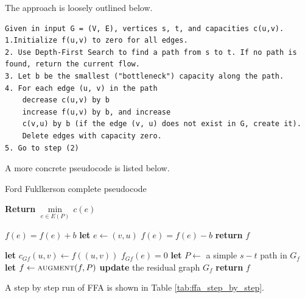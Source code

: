 \documentclass[a4paper]{article}
\begin{document}
The approach is loosely outlined below.
\begin{verbatim}
Given in input G = (V, E), vertices s, t, and capacities c(u,v).
1.Initialize f(u,v) to zero for all edges.
2. Use Depth-First Search to find a path from s to t. If no path is found, return the current flow.
3. Let b be the smallest ("bottleneck") capacity along the path.
4. For each edge (u, v) in the path
    decrease c(u,v) by b
    increase f(u,v) by b, and increase
    c(v,u) by b (if the edge (v, u) does not exist in G, create it).
    Delete edges with capacity zero.
5. Go to step (2)
\end{verbatim}

A more concrete pseudocode is listed below.
\begin{algorithm}[H] %
\caption{Ford Fuklkerson complete pseudocode}
\label{alg:ff_pseudo_final}
\begin{algorithmic}[1]
\State \textbf{Return} $\underset{e\in E\left( P \right)}{\mathop{\min }}\,c\left( e \right)$ 
\EndProcedure
\State

 
\State $f(e) = f(e) + b$
\EndIf
{} 
\State \textbf{let} $e \leftarrow (v,u)$ 
\State $f(e) = f(e) - b$
\EndIf
\EndFor
\State \textbf{return} $f$
\EndProcedure

\State
{}
\State \textbf{let} $c_{Gf}(u,v) \leftarrow f((u,v))$ 
\State $f_{Gf}(e)=0$
\EndFor
{}
\State \textbf{let} $P\leftarrow$ a simple $s-t$ path in $G_f$ 
\State \textbf{let} $f\leftarrow \textsc{augment}(f,P)$
\State \textbf{update} the residual graph $G_f$
\EndWhile
\State \textbf{return} $f$
\EndProcedure
\end{algorithmic}
\end{algorithm}

A step by step run of FFA is shown in Table \ref{tab:ffa_step_by_step}.
\end{document}
